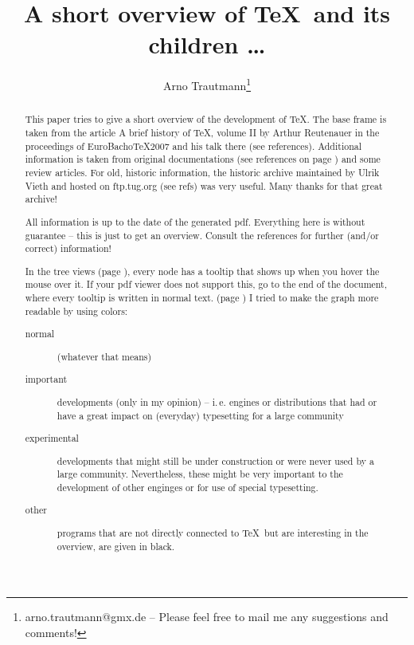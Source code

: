 \documentclass{scrartcl}
\title{A short overview of \TeX\ and its children \dots}
\author{Arno Trautmann\thanks{arno.trautmann@gmx.de -- Please feel free to mail me any suggestions and comments!}}
\date{}
\def\vip{1 0 0}
\def\other{0 0 0}
\def\normalimportant{0 0.5 0}
\def\experimental{0 .7 .7}
\begin{document}
\maketitle

\begin{abstract}
This paper tries to give a short overview of the development of \TeX. The base frame is taken from the article \textsf{A brief history of \TeX, volume II} by Arthur Reutenauer in the proceedings of \textsf{EuroBacho\TeX 2007} and his talk there (see references). Additional information is taken from original documentations (see references on page \pageref{sec:refs}) and some review articles. For old, historic information, the \textsf{historic archive} maintained by Ulrik Vieth and hosted on ftp.tug.org (see refs) was very useful. Many thanks for that great archive!

All information is up to the date of the generated pdf. Everything here is without guarantee -- this is just to get an overview. Consult the references for further (and/or correct) information!

In the tree views (page \pageref{sec:tree}), every node has a tooltip that shows up when you hover the mouse over it. If your pdf viewer does not support this, go to the end of the document, where every tooltip is written in normal text. (page \pageref{sec:text}) I tried to make the graph more readable by using colors:

\begin{description}
\item[{\color[rgb]{\normalimportant} normal}] (whatever that means)
\item[{\color[rgb]{\vip} important}] developments (only in my opinion) -- i.\,e. engines or distributions that had or have a great impact on (everyday) typesetting for a large community
\item[{\color[rgb]{\experimental} experimental}] developments that might still be under construction or were never used by a large community. Nevertheless, these might be very important to the development of other enginges or for use of special typesetting. \item[{\color[rgb]{\other} other}] programs that are not directly connected to \TeX\ but are interesting in the overview, are given in black.
\end{description}
\end{abstract}

\tableofcontents

\clearpage
\end{document}
